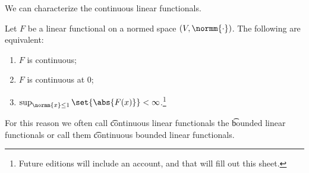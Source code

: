 

We can characterize the continuous linear functionals.


\begin{proposition}
Let $F$ be a linear functional on a normed space $(V, \normm{\cdot})$. The following are equivalent:
\begin{enumerate}
	\item $F$ is continuous;
	\item $F$ is continuous at 0;
  \item $\sup_{\normm{x} \leq 1}\set{\abs{F(x)}} < \infty$.\footnote{Future editions will include an account, and that will fill out this sheet.}
\end{enumerate}
\end{proposition}

For this reason we often call \t{continuous linear functionals} the \t{bounded linear functionals} or call them \t{continuous bounded linear functionals}.

\blankpage
